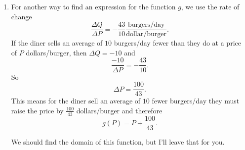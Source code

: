 \documentclass{ximera}
\begin{document}
\begin{example}
\begin{explanation}
\begin{enumerate}
\begin{enumerate}
\begin{enumerate}
\item For another way to find an expression for the function $g$, we use the rate of change
\[
  \frac{\Delta Q}{\Delta P} = -\frac{43}{10} \frac{\text{burgers/day}}{\text{dollar/burger}}.
\] 
If the diner sells an average of $10$ burgers/day fewer than they do at a price of $P$ dollars/burger, then $\Delta Q=  -10$ and
\[
 \frac{-10}{\Delta P} = -\frac{43}{10}.
\]
So
\[
 \Delta P = \frac{100}{43} .
\]
This means for the diner sell an average of $10$ fewer burgers/day they must raise the price by $\frac{100}{43}$ dollars/burger and therefore
\[
      g(P) = P + \frac{100}{43}.
\]

We should find the domain of this function, but I'll leave that for you.
\end{enumerate}

\end{enumerate}
\end{enumerate}
\end{explanation}
\end{example}
\end{document}
